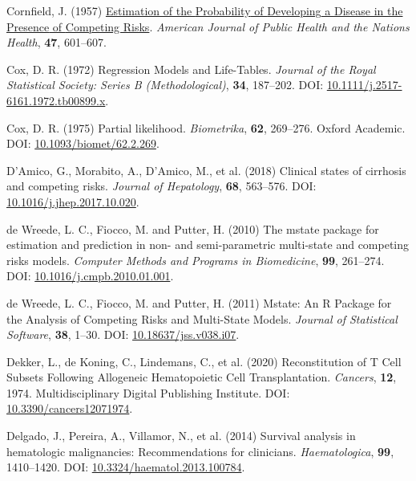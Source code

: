 \documentclass[
  letterpaper,
  DIV=11,
  numbers=noendperiod]{scrreprt}
\newlength{\cslhangindent}
\newenvironment{CSLReferences}[2] %
 {\begin{list}{}{%
  \setlength{\itemindent}{0pt}
  \setlength{\leftmargin}{0pt}
  \setlength{\parsep}{0pt}
  \ifodd #1
   \setlength{\leftmargin}{\cslhangindent}
   \setlength{\itemindent}{-1\cslhangindent}
  \fi
  \setlength{\itemsep}{#2\baselineskip}}}
 {\end{list}}
\begin{document}
\begin{CSLReferences}{1}{1}
Cornfield, J. (1957)
\href{https://www.ncbi.nlm.nih.gov/pmc/articles/PMC1551242}{Estimation
of the {Probability} of {Developing} a {Disease} in the {Presence} of
{Competing Risks}}. \emph{American Journal of Public Health and the
Nations Health}, \textbf{47}, 601--607.

Cox, D. R. (1972) Regression {Models} and {Life-Tables}. \emph{Journal
of the Royal Statistical Society: Series B (Methodological)},
\textbf{34}, 187--202. DOI:
\href{https://doi.org/10.1111/j.2517-6161.1972.tb00899.x}{10.1111/j.2517-6161.1972.tb00899.x}.

Cox, D. R. (1975) Partial likelihood. \emph{Biometrika}, \textbf{62},
269--276. Oxford Academic. DOI:
\href{https://doi.org/10.1093/biomet/62.2.269}{10.1093/biomet/62.2.269}.

D'Amico, G., Morabito, A., D'Amico, M., et al. (2018) Clinical states of
cirrhosis and competing risks. \emph{Journal of Hepatology},
\textbf{68}, 563--576. DOI:
\href{https://doi.org/10.1016/j.jhep.2017.10.020}{10.1016/j.jhep.2017.10.020}.

de Wreede, L. C., Fiocco, M. and Putter, H. (2010) The mstate package
for estimation and prediction in non- and semi-parametric multi-state
and competing risks models. \emph{Computer Methods and Programs in
Biomedicine}, \textbf{99}, 261--274. DOI:
\href{https://doi.org/10.1016/j.cmpb.2010.01.001}{10.1016/j.cmpb.2010.01.001}.

de Wreede, L. C., Fiocco, M. and Putter, H. (2011) Mstate: {An R
Package} for the {Analysis} of {Competing Risks} and {Multi-State
Models}. \emph{Journal of Statistical Software}, \textbf{38}, 1--30.
DOI:
\href{https://doi.org/10.18637/jss.v038.i07}{10.18637/jss.v038.i07}.

Dekker, L., de Koning, C., Lindemans, C., et al. (2020) Reconstitution
of {T Cell Subsets Following Allogeneic Hematopoietic Cell
Transplantation}. \emph{Cancers}, \textbf{12}, 1974. Multidisciplinary
Digital Publishing Institute. DOI:
\href{https://doi.org/10.3390/cancers12071974}{10.3390/cancers12071974}.

Delgado, J., Pereira, A., Villamor, N., et al. (2014) Survival analysis
in hematologic malignancies: Recommendations for clinicians.
\emph{Haematologica}, \textbf{99}, 1410--1420. DOI:
\href{https://doi.org/10.3324/haematol.2013.100784}{10.3324/haematol.2013.100784}.


\end{CSLReferences}
\end{document}
